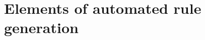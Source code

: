 \documentclass[11pt, a4paper]{article} %
\begin{document}
%
%
%
%
%
%


\section{Elements of automated rule generation}
\end{document}
